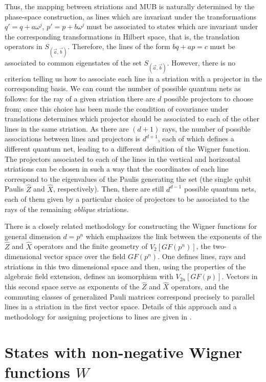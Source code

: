 \documentclass[aps,twocolumn,showpacs,nofootinbib,superscriptaddress]{revtex4}
\begin{document}
Thus, the mapping between striations and MUB is naturally
determined by the phase-space construction, as lines which are
invariant under the transformations $q'=q+a\omega^j$,
$p'=p+b\omega^j$ must be associated to states which are invariant
under the corresponding transformations in Hilbert space, that is,
the translation operators in $S_{(\vec a,\vec b)}$. Therefore, the
lines of the form $bq+ap=c$ must be associated to common
eigenstates of the set $S_{(\vec a,\vec b)}$. However, there is no
criterion telling us how to associate each line in a striation
with a projector in the corresponding basis. We can count the
number of possible quantum nets as follows: for the ray of a given
striation there are $d$ possible projectors to choose from; once
this choice has been made the condition of covariance under
translations determines which projector should be associated to
each of the other lines in the same striation. As there are
$(d+1)$ rays, the number of possible associations between lines
and projectors is $d^{d+1}$, each of which defines a different
quantum net, leading to a different definition of the Wigner
function. The projectors associated to each of the lines in the
vertical and horizontal striations can be chosen in such a way
that the coordinates of each line correspond to the eigenvalues of
the Paulis generating the set (the single qubit Paulis $\hat{Z}$
and $\hat{X}$, respectively). Then, there are still $d^{d-1}$
possible quantum nets, each of them given by a particular choice
of projectors to be associated to the rays of the remaining
\textit{oblique} striations.

There is a closely related methodology for constructing the Wigner
functions for general dimension $d = p^n$ which emphasizes the
link between the exponents of the $\hat{Z}$ and $\hat{X}$
operators and the finite geometry of $V_2[GF(p^n)]$, the
two-dimensional vector space over the field $GF(p^n)$. One defines
lines, rays and striations in this two dimensional space and then,
using the properties of the algebraic field extension, defines an
isomorphism with $V_{2n}[GF(p)]$. Vectors in this second space
serve as exponents of the $\hat{Z}$ and $\hat{X}$ operators, and
the commuting classes of generalized Pauli matrices correspond
precisely to parallel lines in a striation in the first vector
space. Details of this approach and a methodology for assigning
projections to lines are given in \cite{PittengerR04}.

\section{States with non-negative Wigner functions $W$}
\end{document}
